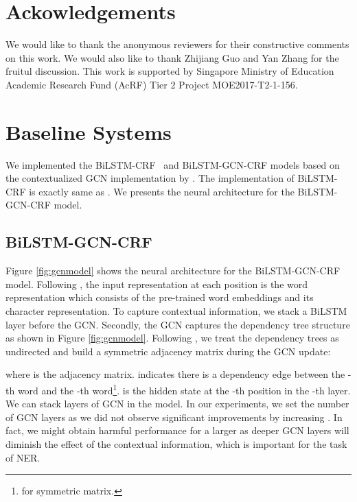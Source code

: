 \documentclass[11pt,a4paper]{article}
\begin{document}
\section*{Ackowledgements}
We would like to thank the anonymous reviewers for their constructive comments on this work. 
We would also like to thank Zhijiang Guo and Yan Zhang for the fruitul discussion. 
This work is supported by Singapore Ministry of Education Academic Research Fund (AcRF) Tier 2 Project MOE2017-T2-1-156.




\newpage

\appendix

\section{Baseline Systems}
We implemented the BiLSTM-CRF~\cite{lample2016neural} and BiLSTM-GCN-CRF models based on the contextualized GCN implementation by \citet{zhang2018graph}. 
The implementation of BiLSTM-CRF is exactly same as \citet{lample2016neural}. 
We presents the neural architecture for the BiLSTM-GCN-CRF model. 
\subsection{BiLSTM-GCN-CRF}
Figure \ref{fig:gcnmodel} shows the neural architecture for the BiLSTM-GCN-CRF model. 
Following \citet{zhang2018graph}, the input representation at each position  is the word representation which consists of the pre-trained word embeddings and its character representation. 
To capture contextual information, we stack a BiLSTM layer before the GCN. 
Secondly, the GCN captures the dependency tree structure as shown in Figure \ref{fig:gcnmodel}. 
Following \citet{zhang2018graph}, we treat the dependency trees as undirected and build a symmetric adjacency matrix during the GCN update:

where  is the adjacency matrix.  indicates there is a dependency edge between the -th word and the -th word\footnote{ for symmetric matrix. }. 
 is the hidden state at the -th position in the -th layer. 
We can stack  layers of GCN in the model. 
In our experiments, we set the number of GCN layers  as we did not observe significant improvements by increasing . 
In fact, we might obtain harmful performance for a larger  as deeper GCN layers will diminish the effect of the contextual information, which is important for the task of NER. 
\end{document}
